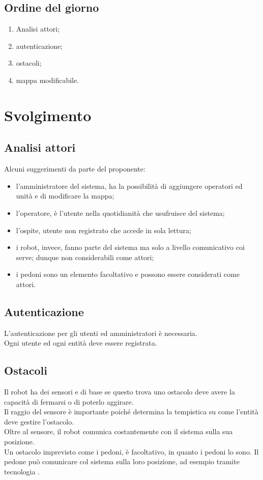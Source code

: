 \documentclass[]{article}
\begin{document}
		\subsection{Ordine del giorno}
		\begin{enumerate}
			\item Analisi attori;
			\item autenticazione;
			\item ostacoli;
			\item mappa modificabile.
		\end{enumerate}
\newpage	
	\section{Svolgimento}
		\subsection{Analisi attori}
		Alcuni suggerimenti da parte del proponente:
		\begin{itemize}
			\item l'amministratore del sistema, ha la possibilità di aggiungere operatori ed unità e di modificare la mappa;
			\item l'operatore, è l'utente nella quotidianità che usufruisce del sistema;
			\item l'ospite, utente non registrato che accede in sola lettura;
			\item i robot, invece, fanno parte del sistema ma solo a livello comunicativo coi serve; dunque non considerabili come attori;
			\item i pedoni sono un elemento facoltativo e possono essere considerati come attori.
		\end{itemize}
		
	
		\subsection{Autenticazione}
		L'autenticazione per gli utenti ed amministratori è necessaria. \\
		Ogni utente ed ogni entità deve essere registrata.
			
		\subsection{Ostacoli}
		Il robot ha dei sensori e di base se questo trova uno ostacolo deve avere la capacità di fermarsi o di poterlo aggirare. \\
		Il raggio del sensore è importante poiché determina la tempistica su come l'entità deve gestire l'ostacolo.\\
		Oltre al sensore, il robot comunica costantemente con il sistema sulla sua posizione. \\
		Un ostacolo imprevisto come i pedoni, è facoltativo, in quanto i pedoni lo sono.
		Il pedone può comunicare col sistema sulla loro posizione, ad esempio tramite tecnologia .
		
\end{document}
